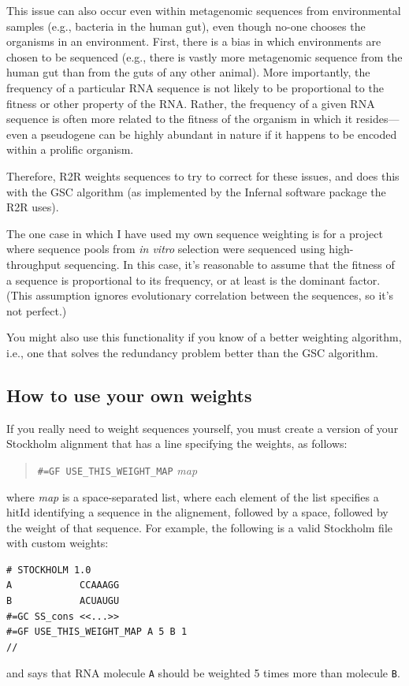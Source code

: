 \documentclass[letterpaper,12pt]{report}
\newcommand{\example}[1]{
\begin{quote}
{\raggedright
#1
}
\end{quote}
}
\begin{document}
This issue can also occur even within metagenomic sequences from environmental samples (e.g., bacteria in the human gut), even though no-one chooses the organisms in an environment.  First, there is a bias in which environments are chosen to be sequenced (e.g., there is vastly more metagenomic sequence from the human gut than from the guts of any other animal).  More importantly, the frequency of a particular RNA sequence is not likely to be proportional to the fitness or other property of the RNA.  Rather, the frequency of a given RNA sequence is often more related to the fitness of the organism in which it resides---even a pseudogene can be highly abundant in nature if it happens to be encoded within a prolific organism.

Therefore, R2R weights sequences to try to correct for these issues, and does this with the GSC algorithm\cite{GSC} (as implemented
by the Infernal\cite{InfernalUserGuide} software package the R2R uses).

The one case in which I have used my own sequence weighting is for a project where sequence pools from {\it in vitro} selection were sequenced using high-throughput sequencing.  In this case, it's reasonable to assume that the fitness of a sequence is proportional to its frequency, or at least is the dominant factor. (This assumption ignores evolutionary correlation between the sequences, so it's not perfect.)

You might also use this functionality if you know of a better weighting algorithm, i.e., one that solves the redundancy problem better than the GSC algorithm.

\subsection{How to use your own weights}

If you really need to weight sequences yourself, you must create a version of your Stockholm alignment that has a line specifying the weights, as follows:
\example{
{\tt \#=GF USE\_THIS\_WEIGHT\_MAP} {\it map}
}
where {\it map} is a space-separated list, where each element of the list specifies a hitId identifying a sequence in the alignement,
followed by a space, followed by the weight of that sequence.  For example, the following is a valid Stockholm file with custom weights:
\begin{verbatim}
# STOCKHOLM 1.0
A            CCAAAGG
B            ACUAUGU
#=GC SS_cons <<...>>
#=GF USE_THIS_WEIGHT_MAP A 5 B 1
//
\end{verbatim}
and says that RNA molecule {\tt A} should be weighted 5 times more than molecule {\tt B}.
\end{document}
